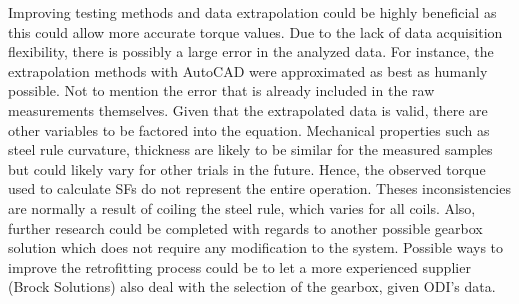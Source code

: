 Improving testing methods and data extrapolation could be highly beneficial as this could allow more
accurate torque values. Due to the lack of data acquisition flexibility, there is possibly a large error in the
analyzed data. For instance, the extrapolation methods with AutoCAD were approximated as best as
humanly possible. Not to mention the error that is already included in the raw measurements themselves.
Given that the extrapolated data is valid, there are other variables to be factored into the equation.
Mechanical properties such as steel rule curvature, thickness are likely to be similar for the measured
samples but could likely vary for other trials in the future. Hence, the observed torque used to calculate SFs
do not represent the entire operation. Theses inconsistencies are normally a result of coiling the steel rule,
which varies for all coils. Also, further research could be completed with regards to another possible
gearbox solution which does not require any modification to the system. Possible ways to improve the
retrofitting process could be to let a more experienced supplier (Brock Solutions) also deal with the selection
of the gearbox, given ODI’s data.